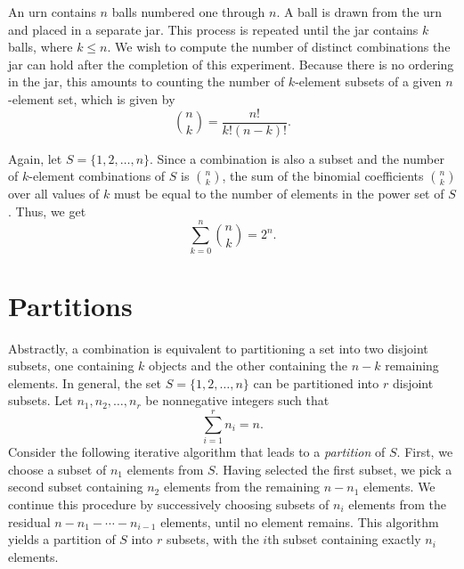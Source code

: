 \begin{example}
An urn contains $n$ balls numbered one through $n$.
A ball is drawn from the urn and placed in a separate jar.
This process is repeated until the jar contains $k$ balls, where $k \leq n$.
We wish to compute the number of distinct combinations the jar can hold after the completion of this experiment.
Because there is no ordering in the jar, this amounts to counting the number of $k$-element subsets of a given $n$-element set, which is given by
\begin{equation*}
\binom{n}{k} = \frac{n!}{k! (n-k)!}.
\end{equation*}
\end{example}

Again, let $S = \{1, 2, \ldots, n\}$.
Since a combination is also a subset and the number of $k$-element combinations of $S$ is $\binom{n}{k}$, the sum of the binomial coefficients $\binom{n}{k}$ over all values of $k$ must be equal to the number of elements in the power set of $S$. 
Thus, we get
\begin{equation*}
\sum_{k=0}^n \binom{n}{k} = 2^n .
\end{equation*}


\section{Partitions}

Abstractly, a combination is equivalent to partitioning a set into two disjoint subsets, one containing $k$ objects and the other containing the $n-k$ remaining elements.
In general, the set $S = \{ 1, 2, \ldots, n \}$ can be partitioned into $r$ disjoint subsets.
Let $n_1, n_2, \ldots, n_r$ be nonnegative integers such that
\begin{equation*}
\sum_{i = 1}^r n_i = n.
\end{equation*}
Consider the following iterative algorithm that leads to a \emph{partition} of $S$. 
First, we choose a subset of $n_1$ elements from $S$.
Having selected the first subset, we pick a second subset containing $n_2$ elements from the remaining $n - n_1$ elements.
We continue this procedure by successively choosing subsets of $n_i$ elements from the residual $n - n_1 - \cdots - n_{i-1}$ elements, until no element remains.
This algorithm yields a partition of $S$ into $r$ subsets, with the $i$th subset containing exactly $n_i$ elements.

